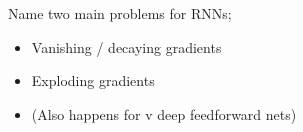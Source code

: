 \documentclass{article}
\begin{document}
Name two main problems for RNNs; \begin{itemize}
    \item Vanishing / decaying gradients
    \item Exploding gradients
    \item (Also happens for v deep feedforward nets)
\end{itemize}
\end{document}
